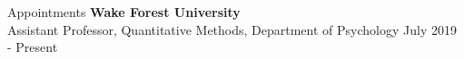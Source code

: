 \begin{rSection}{\textrm{Appointments}}
{\bf Wake Forest University}\\
Assistant Professor, Quantitative Methods, Department of Psychology \hfill{July 2019 - Present}
\end{rSection}